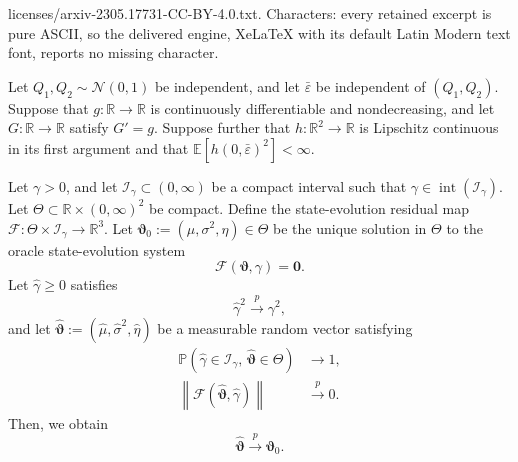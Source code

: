 \documentclass[10pt,a4paper]{amsart}
\newcommand{\pconv}{\overset{{p}}{\to}}
\newcommand{\pr}{\mathbb{P}}
\renewcommand{\hat}{\widehat}
\begin{document}
licenses/arxiv-2305.17731-CC-BY-4.0.txt. Characters: every retained excerpt is pure ASCII, so the delivered engine, XeLaTeX with its default Latin Modern text font, reports no missing character.
\begin{lemma}
\label{lem:SE-conv}
Let $Q_1,Q_2\sim\mathcal{N}(0,1)$ be independent, and let
$\bar\varepsilon$ be independent of $(Q_1,Q_2)$. Suppose that
$g:\mathbb{R}\to\mathbb{R}$ is continuously differentiable and
nondecreasing, and let $G:\mathbb{R}\to\mathbb{R}$ satisfy $G'=g$.
Suppose further that
$h:\mathbb{R}^2\to\mathbb{R}$ is Lipschitz continuous in its first
argument and that $\mathbb{E}\left[h(0,\bar\varepsilon)^2\right]<\infty.$

Let $\gamma>0$, and let
$\mathcal I_\gamma\subset(0,\infty)$ be a compact interval such that $\gamma\in\operatorname{int}(\mathcal I_\gamma).$
Let $\Theta\subset\mathbb{R}\times(0,\infty)^2$ be compact. 
Define the state-evolution residual map $\mathcal F:
\Theta\times\mathcal I_\gamma
\rightarrow
\mathbb{R}^3$.
Let $\bm\vartheta_0:=(\mu,\sigma^2,\eta)\in\Theta$ be the unique solution in $\Theta$ to the oracle state-evolution system
\[
\mathcal F(\bm\vartheta,\gamma)=\bm 0.
\]
Let $\hat\gamma\ge0$ satisfies
\[
\hat\gamma^2\pconv\gamma^2,
\]
and let $\hat{\bm\vartheta}:=(\hat\mu,\hat\sigma^2,\hat\eta)$ be a measurable random vector satisfying
\begin{align}
\pr\left(
\hat\gamma\in\mathcal I_\gamma,\,
\hat{\bm\vartheta}\in\Theta
\right)
&\rightarrow1,
\label{eq:plugin-SE-compactness}\\
\left\|
\mathcal F(\hat{\bm\vartheta},\hat\gamma)
\right\|
&\pconv0.
\label{eq:plugin-SE-approx-root}
\end{align}
Then, we obtain
\[
\hat{\bm\vartheta}
\pconv
\bm\vartheta_0.
\]
\end{lemma}
\end{document}
